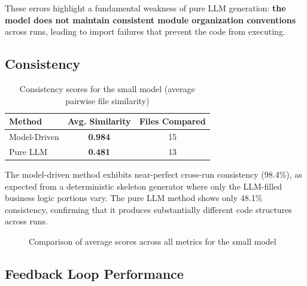 \documentclass[11pt,a4paper]{article}
\begin{document}
These errors highlight a fundamental weakness of pure LLM generation: \textbf{the model does not maintain consistent module organization conventions} across runs, leading to import failures that prevent the code from executing.

\subsection{Consistency}

\begin{table}[H]
\centering
\caption{Consistency scores for the small model (average pairwise file similarity)}
\label{tab:consistency}
\begin{tabular}{lcc}
\toprule
\textbf{Method} & \textbf{Avg. Similarity} & \textbf{Files Compared} \\
\midrule
Model-Driven & \textbf{0.984} & 15 \\
Pure LLM     & \textbf{0.481} & 13 \\
\bottomrule
\end{tabular}
\end{table}

The model-driven method exhibits near-perfect cross-run consistency (98.4\%), as expected from a deterministic skeleton generator where only the LLM-filled business logic portions vary. The pure LLM method shows only 48.1\% consistency, confirming that it produces substantially different code structures across runs.

\begin{figure}[H]
\centering
{}
\caption{Comparison of average scores across all metrics for the small model}
\label{fig:barchart}
\end{figure}

\subsection{Feedback Loop Performance}
\end{document}
